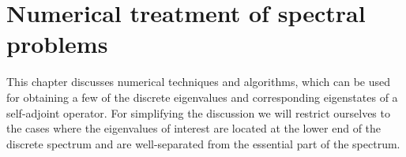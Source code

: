 \chapter{Numerical treatment of spectral problems}
\label{ch:numeigen}


\noindent
This chapter discusses numerical techniques
and algorithms,
which can be used for obtaining a few of the discrete
eigenvalues and corresponding eigenstates
of a self-adjoint operator.
For simplifying the discussion we will restrict ourselves
to the cases where the eigenvalues of interest
are located at the lower end of the discrete spectrum
and are well-separated from the essential part of the spectrum.



